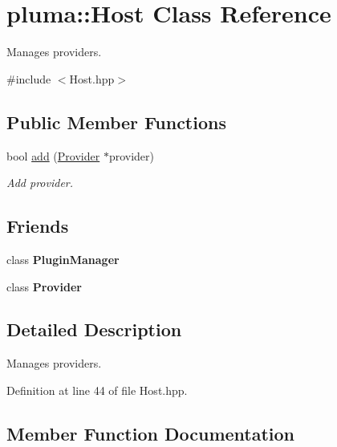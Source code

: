\hypertarget{classpluma_1_1_host}{}\section{pluma\+:\+:Host Class Reference}
\label{classpluma_1_1_host}


Manages providers.  




{\ttfamily \#include $<$Host.\+hpp$>$}

\subsection*{Public Member Functions}
\begin{DoxyCompactItemize}
\item 
bool \hyperlink{classpluma_1_1_host_ab673ba94ff56a12cdf2a7a25ebb8cc36}{add} (\hyperlink{classpluma_1_1_provider}{Provider} $\ast$provider)
\begin{DoxyCompactList}\small\item\em Add provider. \end{DoxyCompactList}\end{DoxyCompactItemize}
\subsection*{Friends}
\begin{DoxyCompactItemize}
\item 
class {\bfseries Plugin\+Manager}\hypertarget{classpluma_1_1_host_ad0ccd35859b04e162412b22bf5200374}{}\label{classpluma_1_1_host_ad0ccd35859b04e162412b22bf5200374}

\item 
class {\bfseries Provider}\hypertarget{classpluma_1_1_host_a70ab087352a74128b9608cf9e7d24c71}{}\label{classpluma_1_1_host_a70ab087352a74128b9608cf9e7d24c71}

\end{DoxyCompactItemize}


\subsection{Detailed Description}
Manages providers. 

Definition at line 44 of file Host.\+hpp.



\subsection{Member Function Documentation}
